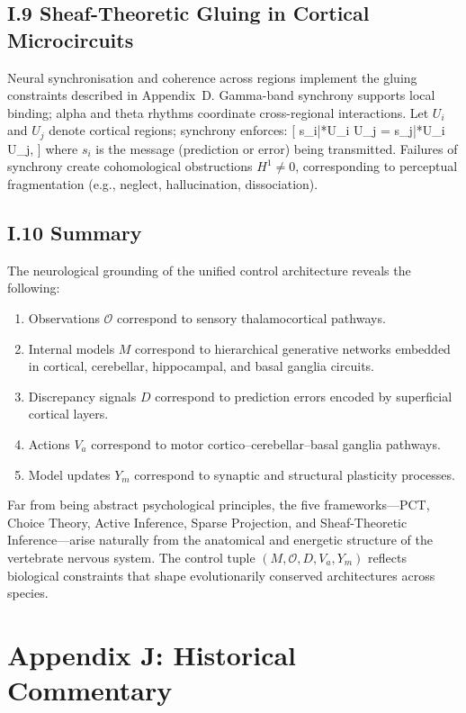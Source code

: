 \documentclass[11pt,a4paper,twoside]{article}
\begin{document}
\subsection*{I.9 Sheaf-Theoretic Gluing in Cortical Microcircuits}

Neural synchronisation and coherence across regions implement the gluing constraints described in Appendix~D. Gamma-band synchrony supports local binding; alpha and theta rhythms coordinate cross-regional interactions. Let $U_i$ and $U_j$ denote cortical regions; synchrony enforces:
[
s_i|*{U_i \cap U_j} = s_j|*{U_i \cap U_j},
]
where $s_i$ is the message (prediction or error) being transmitted. Failures of synchrony create cohomological obstructions $H^1 \neq 0$, corresponding to perceptual fragmentation (e.g., neglect, hallucination, dissociation).

\subsection*{I.10 Summary}

The neurological grounding of the unified control architecture reveals the following:

\begin{enumerate}
\item Observations $\mathcal{O}$ correspond to sensory thalamocortical pathways.
\item Internal models $M$ correspond to hierarchical generative networks embedded in cortical, cerebellar, hippocampal, and basal ganglia circuits.
\item Discrepancy signals $D$ correspond to prediction errors encoded by superficial cortical layers.
\item Actions $V_a$ correspond to motor cortico--cerebellar--basal ganglia pathways.
\item Model updates $Y_m$ correspond to synaptic and structural plasticity processes.
\end{enumerate}

Far from being abstract psychological principles, the five frameworks—PCT, Choice Theory, Active Inference, Sparse Projection, and Sheaf-Theoretic Inference—arise naturally from the anatomical and energetic structure of the vertebrate nervous system. The control tuple $(M,\mathcal{O},D,V_a,Y_m)$ reflects biological constraints that shape evolutionarily conserved architectures across species.

\section*{Appendix J: Historical Commentary}
\end{document}
